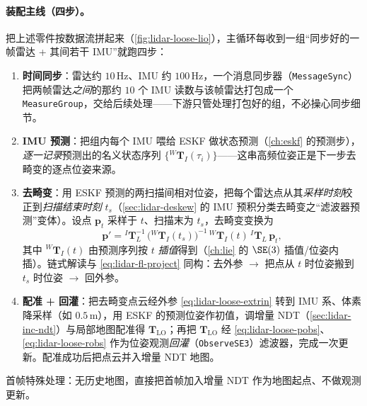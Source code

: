 \paragraph{装配主线（四步）。}
把上述零件按数据流拼起来（\cref{fig:lidar-loose-lio}），主循环每收到一组“同步好的一帧雷达 + 其间若干 IMU”就跑四步\cite{gao2023slamad}：
\begin{enumerate}
  \item \textbf{时间同步}：雷达约 $10$\,Hz、IMU 约 $100$\,Hz，一个消息同步器（\texttt{MessageSync}）把两帧雷达\emph{之间}的那约 $10$ 个 IMU 读数与该帧雷达打包成一个 \texttt{MeasureGroup}，交给后续处理——下游只管处理打包好的组，不必操心同步细节。
  \item \textbf{IMU 预测}：把组内每个 IMU 喂给 ESKF 做状态预测（\cref{ch:eskf} 的预测步），\emph{逐一记录}预测出的名义状态序列 $\{{}^W\mathbf{T}_I(\tau_i)\}$——这串高频位姿正是下一步去畸变的逐点位姿来源。
  \item \textbf{去畸变}：用 ESKF 预测的两扫描间相对位姿，把每个雷达点从其\emph{采样时刻}校正到\emph{扫描结束时刻} $t_s$（\cref{sec:lidar-deskew} 的 IMU 预积分类去畸变之“滤波器预测”变体）。设点 $\mathbf{p}_t$ 采样于 $t$、扫描末为 $t_s$，去畸变变换为
  \begin{equation}
    \mathbf{p}'={}^I\mathbf{T}_L^{-1}\,\big({}^W\mathbf{T}_I(t_s)\big)^{-1}\,{}^W\mathbf{T}_I(t)\,{}^I\mathbf{T}_L\,\mathbf{p}_t,
    \label{eq:lidar-loose-undistort}
  \end{equation}
  其中 ${}^W\mathbf{T}_I(t)$ 由预测序列按 $t$ \emph{插值}得到（\cref{ch:lie} 的 $\SE(3)$ 插值/位姿内插）。链式解读与 \cref{eq:lidar-fl-project} 同构：去外参 $\to$ 把点从 $t$ 时位姿搬到 $t_s$ 时位姿 $\to$ 回外参。
  \item \textbf{配准 + 回灌}：把去畸变点云经外参 \cref{eq:lidar-loose-extrin} 转到 IMU 系、体素降采样（如 $0.5$\,m），用 ESKF 的预测位姿作初值，调增量 NDT（\cref{sec:lidar-inc-ndt}）与局部地图配准得 $\mathbf{T}_{\text{LO}}$；再把 $\mathbf{T}_{\text{LO}}$ 经 \cref{eq:lidar-loose-pobs}、\cref{eq:lidar-loose-robs} 作为位姿观测\emph{回灌}（\texttt{ObserveSE3}）滤波器，完成一次更新。配准成功后把点云并入增量 NDT 地图。
\end{enumerate}
首帧特殊处理：无历史地图，直接把首帧加入增量 NDT 作为地图起点、不做观测更新。

